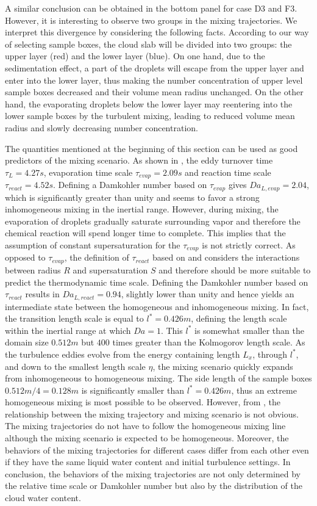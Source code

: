 A similar conclusion can be obtained in the bottom panel for case D3 and F3.
However, it is interesting to observe two groups in the mixing trajectories. We
interpret this divergence by considering the following facts. According to our
way of selecting sample boxes, the cloud slab will be divided into two groups:
the upper layer (red) and the lower layer (blue). On one hand, due to the
sedimentation effect, a part of the droplets will escape from the upper layer
and enter into the lower layer, thus making the number concentration of upper
level sample boxes decreased and their volume mean radius unchanged. On the
other hand, the evaporating droplets below the lower layer may reentering into
the lower sample boxes by the turbulent mixing, leading to reduced volume mean
radius and slowly decreasing number concentration.

The quantities mentioned at the beginning of this section can be used as good
predictors of the mixing scenario. As shown in , the eddy
turnover time $\tau_L = 4.27s$, evaporation time scale $\tau_{evap} = 2.09s$
and reaction time scale $\tau_{react} = 4.52s$. Defining a Damkohler number
based on $\tau_{evap}$ gives $Da_{L,evap} = 2.04$, which is significantly
greater than unity and seems to favor a strong inhomogeneous mixing in the
inertial range. However, during mixing, the evaporation of droplets gradually
saturate surrounding vapor and therefore the chemical reaction will spend
longer time to complete. This implies that the assumption of constant
supersaturation for the $\tau_{evap}$ is not strictly correct.  As opposed to
$\tau_{evap}$, the definition of $\tau_{react}$ based on  and
 considers the interactions between radius $R$ and
supersaturation $S$ and therefore should be more suitable to predict the
thermodynamic time scale. Defining the Damkohler number based on $\tau_{react}$
results in $Da_{L,react} = 0.94$, slightly lower than unity and hence yields an
intermediate state between the homogeneous and inhomogeneous mixing. In fact,
the transition length scale is equal to $l^{*} = 0.426m$, defining the length
scale within the inertial range at which $Da = 1$. This $l^*$ is somewhat
smaller than the domain size $0.512m$ but $400$ times greater than the
Kolmogorov length scale. As the turbulence eddies evolve from the energy
containing length $L_x$, through $l^*$, and down to the smallest length scale
$\eta$, the mixing scenario quickly expands from inhomogeneous to homogeneous
mixing. The side length of the sample boxes $0.512m/4 = 0.128 m$ is
significantly smaller than $l^* = 0.426m$, thus an extreme homogeneous mixing
is most possible to be observed. However, from , the
relationship between the mixing trajectory and mixing scenario is not obvious.
The mixing trajectories do not have to follow the homogeneous mixing line
although the mixing scenario is expected to be homogeneous. Moreover, the
behaviors of the mixing trajectories for different cases differ from each other
even if they have the same liquid water content and initial turbulence
settings. In conclusion, the behaviors of the mixing trajectories are not only
determined by the relative time scale or Damkohler number but also by the
distribution of the cloud water content.

